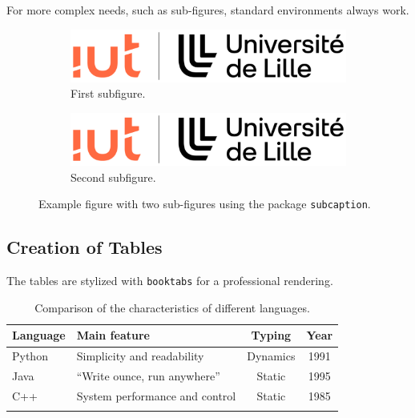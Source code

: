 \documentclass{mytex}
\begin{document}

For more complex needs, such as sub-figures, standard environments always work.

\begin{figure}[H]
	\centering
	\begin{subfigure}{0.45\textwidth}
		\centering
		\includegraphics[width=0.8\linewidth]{logos/logo.png}
		\caption{First subfigure.}
		\label{fig:sub1}
	\end{subfigure}
	\hfill %
	\begin{subfigure}{0.45\textwidth}
		\centering
		\includegraphics[width=0.8\linewidth]{logos/logo_ECL.jpg}
		\caption{Second subfigure.}
		\label{fig:sub2}
	\end{subfigure}
	\caption{Example figure with two sub-figures using the package \texttt{subcaption}.}
	\label{fig:sousfigures}
\end{figure}


\subsection{Creation of Tables}
The tables are stylized with \texttt{booktabs} for a professional rendering.

\begin{table}[H]
	\centering
	\caption{Comparison of the characteristics of different languages.}
	\label{tab:langages}
	\begin{tabular}{l >{\raggedright\arraybackslash}p{4cm} c c}
		\toprule
		\textbf{Language} & \textbf{Main feature} & \textbf{Typing} & \textbf{Year} \\
		\midrule
		Python & Simplicity and readability & Dynamics & 1991 \\
		Java & \enquote{Write ounce, run anywhere} & Static & 1995 \\
		C++ & System performance and control & Static & 1985 \\
		\rowcolor{lightgray!50} %
		\multirow{-4}{*}{\rotatebox{90}{\textbf{Popular}}} & & & \\
		\bottomrule
	\end{tabular}
\end{table}
\end{document}
